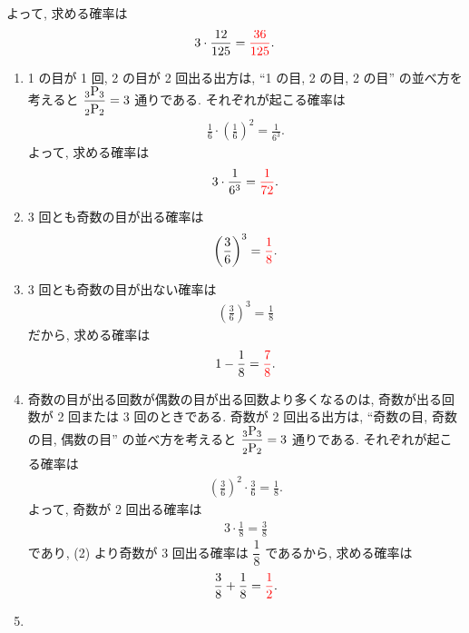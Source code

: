 \begin{qenumerate}
{\begin{enumerate}
{				よって, 求める確率は
				\begin{align}
					3\cdot\frac{12}{125} = \textcolor{red}{\frac{36}{125}}.
				\end{align}
			}
		\end{enumerate}
	}
	\item{
		\begin{enumerate}
			\item{
				1 の目が 1 回, 2 の目が 2 回出る出方は, ``1 の目, 2 の目, 2 の目'' の並べ方を考えると $\dfrac{{{}_{3}\mathrm{P}_{3}}}{{{}_{2}\mathrm{P}_{2}}} = 3$ 通りである.
				それぞれが起こる確率は
				\begin{align}
					\frac{1}{6}\cdot\left(\frac{1}{6}\right)^{2} = \frac{1}{6^{3}}.
				\end{align}
				よって, 求める確率は
				\begin{align}
					3\cdot\frac{1}{6^{3}} = \textcolor{red}{\frac{1}{72}}.
				\end{align}
			}
			\item{
				3 回とも奇数の目が出る確率は
				\begin{align}
					\left(\frac{3}{6}\right)^{3} = \textcolor{red}{\frac{1}{8}}.
				\end{align}
			}
			\item{
				3 回とも奇数の目が出ない確率は
				\begin{align}
					\left(\frac{3}{6}\right)^{3} = \frac{1}{8}
				\end{align}
				だから, 求める確率は
				\begin{align}
					1 - \frac{1}{8} = \textcolor{red}{\frac{7}{8}}.
				\end{align}
			}
			\item{
				奇数の目が出る回数が偶数の目が出る回数より多くなるのは, 奇数が出る回数が 2 回または 3 回のときである.
				奇数が 2 回出る出方は, ``奇数の目, 奇数の目, 偶数の目'' の並べ方を考えると $\dfrac{{{}_{3}\mathrm{P}_{3}}}{{{}_{2}\mathrm{P}_{2}}} = 3$ 通りである.
				それぞれが起こる確率は
				\begin{align}
					\left(\frac{3}{6}\right)^{2}\cdot\frac{3}{6} = \frac{1}{8}.
				\end{align}
				よって, 奇数が 2 回出る確率は
				\begin{align}
					3\cdot\frac{1}{8} = \frac{3}{8}
				\end{align}
				であり, (2) より奇数が 3 回出る確率は $\dfrac{1}{8}$ であるから, 求める確率は
				\begin{align}
					\frac{3}{8} + \frac{1}{8} = \textcolor{red}{\frac{1}{2}}.
				\end{align}
			}
			\item{
}
\end{enumerate}}
\end{qenumerate}
